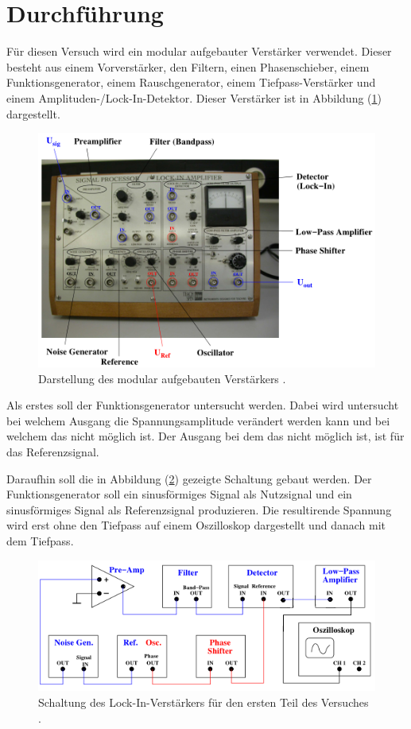 \section{Durchführung}

Für diesen Versuch wird ein modular aufgebauter Verstärker verwendet. Dieser besteht
aus einem Vorverstärker, den Filtern, einen Phasenschieber, einem Funktionsgenerator,
einem Rauschgenerator, einem Tiefpass-Verstärker und einem Amplituden-/Lock-In-Detektor.
Dieser Verstärker ist in Abbildung (\ref{abb:2}) dargestellt.

\begin{figure}[H]
  \centering
  \includegraphics{Verstaerker.png}
  \caption{Darstellung des modular aufgebauten Verstärkers \cite{1}.}
  \label{abb:2}
\end{figure}

Als erstes soll der Funktionsgenerator untersucht werden. Dabei wird untersucht bei
welchem Ausgang die Spannungsamplitude verändert werden kann und bei welchem das nicht
möglich ist. Der Ausgang bei dem das nicht möglich ist, ist für das Referenzsignal.

Daraufhin soll die in Abbildung (\ref{abb:3}) gezeigte Schaltung gebaut werden. Der
Funktionsgenerator soll ein sinusförmiges Signal als Nutzsignal und ein sinusförmiges
Signal als Referenzsignal produzieren. Die resultirende Spannung wird erst ohne den
Tiefpass auf einem Oszilloskop dargestellt und danach mit dem Tiefpass.

\begin{figure}[H]
  \centering
  \includegraphics{Schaltung1.png}
  \caption{Schaltung des Lock-In-Verstärkers für den ersten Teil des Versuches \cite{1}.}
  \label{abb:3}
\end{figure}

